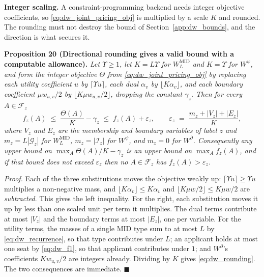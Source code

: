 \documentclass{article}
\begin{document}
\noindent\textbf{Integer scaling.}
A constraint-programming backend needs integer objective coefficients, so
\eqref{eq:dw_joint_pricing_obj} is multiplied by a scale $K$ and rounded. The
rounding must not destroy the bound of Section~\ref{app:dw_bounds}, and the
direction is what secures it.

\noindent\textbf{Proposition 20 (Directional rounding gives a valid bound with a
computable allowance).} \textit{Let $\Upsilon \geq 1$, let $K = L\Upsilon$ for
$W^{\mathrm{MID}}_L$ and $K = \Upsilon$ for $W^{\psi}$, and form the integer
objective $\Theta$ from \eqref{eq:dw_joint_pricing_obj} by replacing each
utility coefficient $u$ by $\lceil \Upsilon u \rceil$, each dual $\alpha_v$ by
$\lfloor K\alpha_v \rfloor$, and each boundary coefficient
$\mu w_{u,v}/2$ by $\lfloor K \mu w_{u,v}/2 \rfloor$, dropping the constant
$\gamma_z$. Then for every $A \in \mathcal F_z$}
\begin{equation}\label{eq:dw_rounding}
f_z(A) \;\leq\; \frac{\Theta(A)}{K} - \gamma_z \;\leq\; f_z(A) + \varepsilon_z,
\qquad
\varepsilon_z \;=\; \frac{m_z + |V_z| + |E_z|}{K},
\end{equation}
\textit{where $V_z$ and $E_z$ are the membership and boundary variables of label
$z$ and $m_z = L|\mathcal G_{z}|$ for $W^{\mathrm{MID}}_L$,
$m_z = |\mathcal I_{z}|$ for $W^{\psi}$, and $m_z = 0$ for $W^{\partial}$.
Consequently any upper bound on $\max_A \Theta(A)/K - \gamma_z$ is an upper
bound on $\max_A f_z(A)$, and if that bound does not exceed $\varepsilon_z$ then
no $A \in \mathcal F_z$ has $f_z(A) > \varepsilon_z$.}

\textit{Proof.} Each of the three substitutions moves the objective weakly up:
$\lceil \Upsilon u \rceil \geq \Upsilon u$ multiplies a non-negative mass, and
$\lfloor K \alpha_v \rfloor \le K\alpha_v$ and
$\lfloor K\mu w/2 \rfloor \le K\mu w/2$ are \emph{subtracted}. This gives the
left inequality. For the right, each substitution moves it up by less than one
scaled unit per term it multiplies. The dual terms contribute at most $|V_z|$
and the boundary terms at most $|E_z|$, one per variable. For the utility
terms, the masses of a single MID type sum to at most $L$ by
\eqref{eq:dw_recurrence}, so that type contributes under $L$; an applicant
holds at most one seat by \eqref{eq:dw_f1}, so that applicant contributes under
$1$; and $W^{\partial}$'s coefficients $K w_{u,v}/2$ are integers already.
Dividing by $K$ gives \eqref{eq:dw_rounding}. The two consequences are
immediate. $\blacksquare$
\end{document}
